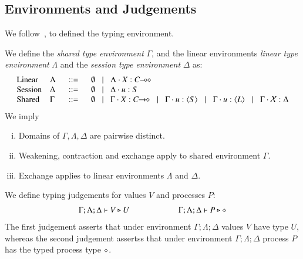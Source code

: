 
\subsection{Environments and Judgements}
%
We follow~\cite{tlca07},
to defined the typing environment.
%
\begin{definition}\rm
	We define the {\em shared type environment} $\Gamma$,
	and the linear environments
	{\em linear type environment} $\Lambda$ and
	the {\em session type environment} $\Delta$ as:
	\[
	\begin{array}{llcl}
		\text{Linear}	& \Lambda & \bnfis &	\emptyset \bnfbar \Lambda \cat \varp{X}: \lhot{C}\\
		\text{Session}	& \Delta  & \bnfis &	\emptyset \bnfbar \Delta \cat u:S \\
		\text{Shared}	& \Gamma  & \bnfis &	\emptyset \bnfbar \Gamma \cat \varp{X}: \shot{C} \bnfbar \Gamma \cat u: \chtype{S} \bnfbar
							\Gamma \cat u: \chtype{L} \bnfbar \Gamma \cat \rvar{X}: \Delta
	\end{array}
	\]
	We imply
	\begin{enumerate}[i.]
		\item	Domains of $\Gamma, \Lambda, \Delta$ are pairwise distinct.
		\item	Weakening, contraction and exchange apply to shared environment $\Gamma$.
		\item	Exchange applies to linear environments $\Lambda$ and $\Delta$. 
	\end{enumerate}
\end{definition}
%
\noi We define typing judgements for values $V$
and processes $P$:
%
\[	\begin{array}{c}
		\Gamma; \Lambda; \Delta \vdash V \triangleright U \qquad \qquad \qquad \Gamma; \Lambda; \Delta \vdash P \triangleright \diamond
	\end{array}
\]
%
The first judgement asserts that under environment $\Gamma; \Lambda; \Delta$
values $V$ have type $U$,
whereas the second judgement assertss that under environment $\Gamma; \Lambda; \Delta$
process $P$ has the typed process type $\diamond$.

